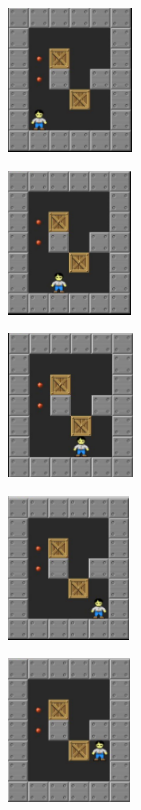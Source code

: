 \documentclass[10pt, final]{article}
\begin{document}
				\begin{figure}[h!]
			{
				\begin{subfigure}[h!]{1.3in}
					\includegraphics[height=1.5in]{r1.png}
				\end{subfigure}
				\begin{subfigure}[h!]{1.3in}
					\includegraphics[height=1.5in]{r2.png}
				\end{subfigure}
				\begin{subfigure}[h!]{1.3in}
					\includegraphics[height=1.5in]{r3.png}
				\end{subfigure}
				\begin{subfigure}[h!]{1.3in}
					\includegraphics[height=1.5in]{r4.png}
				\end{subfigure}
				\begin{subfigure}[h!]{1.3in}
					\includegraphics[height=1.5in]{r5.png}
			\end{subfigure}}
			\label{fig:chain}
		\end{figure}
		
\end{document}
